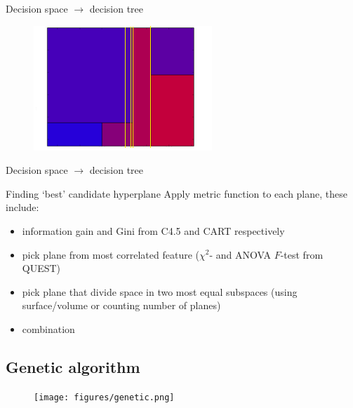 \documentclass[english]{beamer}
\begin{document}
\begin{frame}{Decision space $\rightarrow$ decision tree}
	\begin{figure}
		\centering
		\includegraphics[scale=1]{figures/space_to_dt.png}
	\end{figure}	
\end{frame}

\begin{frame}{Decision space $\rightarrow$ decision tree}
	\begin{block}{Finding `best' candidate hyperplane}
		Apply metric function to each plane, these include:
		\begin{itemize}
			\item information gain and Gini from C4.5 and CART respectively
			\item pick plane from most correlated feature ($\chi^2$- and ANOVA $F$-test from QUEST)
			\item pick plane that divide space in two most equal subspaces (using surface/volume or counting number of planes)
			\item combination
		\end{itemize}
	\end{block}
	
\end{frame}


\subsection*{Genetic algorithm}
{
\begin{frame}{}
	\begin{figure}
		\centering
		\texttt{[image: figures/genetic.png]}
	\end{figure}	
\end{frame} }
\end{document}
